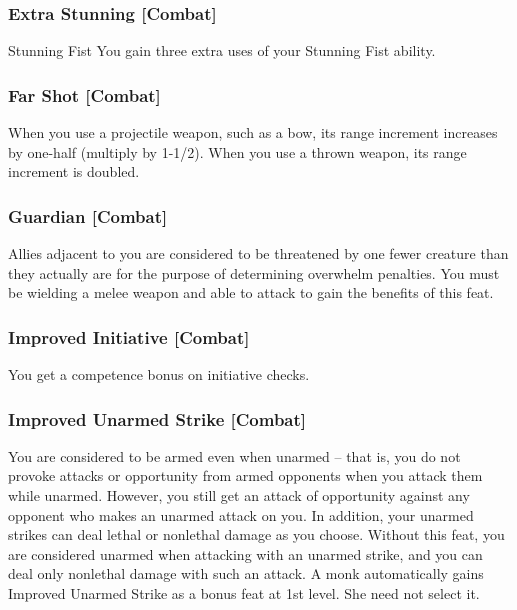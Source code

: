 \subsubsection{Extra Stunning [Combat]}
 Stunning Fist
 You gain three extra uses of your Stunning Fist ability.

\subsubsection{Far Shot [Combat]}
 When you use a projectile weapon, such as a bow, its range increment increases by one-half (multiply by 1-1/2). When you use a thrown weapon, its range increment is doubled.


\subsubsection{Guardian [Combat]}
 Allies adjacent to you are considered to be threatened by one fewer creature than they actually are for the purpose of determining overwhelm penalties. You must be wielding a melee weapon and able to attack to gain the benefits of this feat.

\subsubsection{Improved Initiative [Combat]}
 You get a  competence bonus on initiative checks.

\subsubsection{Improved Unarmed Strike [Combat]}
 You are considered to be armed even when unarmed -- that is, you do not provoke attacks or opportunity from armed opponents when you attack them while unarmed. However, you still get an attack of opportunity against any opponent who makes an unarmed attack on you.
In addition, your unarmed strikes can deal lethal or nonlethal damage as you choose.
 Without this feat, you are considered unarmed when attacking with an unarmed strike, and you can deal only nonlethal damage with such an attack.
 A monk automatically gains Improved Unarmed Strike as a bonus feat at 1st level. She need not select it.

